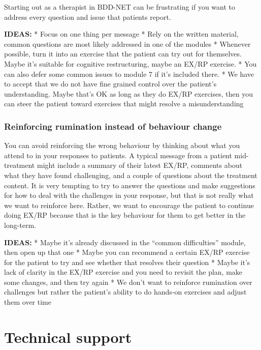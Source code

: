\documentclass[]{book}
\theoremstyle{definition}
\theoremstyle{definition}
\theoremstyle{definition}
\theoremstyle{remark}
\begin{document}
Starting out as a therapist in BDD-NET can be frustrating if you want to
address every question and issue that patients report.

\textbf{IDEAS:} * Focus on one thing per message * Rely on the written
material, common questions are most likely addressed in one of the
modules * Whenever possible, turn it into an exercise that the patient
can try out for themselves. Maybe it's suitable for cognitive
restructuring, maybe an EX/RP exercise. * You can also defer some common
issues to module 7 if it's included there. * We have to accept that we
do not have fine grained control over the patient's understanding. Maybe
that's OK as long as they do EX/RP exercises, then you can steer the
patient toward exercises that might resolve a misunderstanding

\hypertarget{reinforcing-rumination-instead-of-behaviour-change}{%
\subsection{Reinforcing rumination instead of behaviour
change}\label{reinforcing-rumination-instead-of-behaviour-change}}

You can avoid reinforcing the wrong behaviour by thinking about what you
attend to in your responses to patients. A typical message from a
patient mid-treatment might include a summary of their latest EX/RP,
comments about what they have found challenging, and a couple of
questions about the treatment content. It is very tempting to try to
answer the questions and make suggestions for how to deal with the
challenges in your response, but that is not really what we want to
reinforce here. Rather, we want to encourage the patient to continue
doing EX/RP because that is the key behaviour for them to get better in
the long-term.

\textbf{IDEAS:} * Maybe it's already discussed in the ``common
difficulties'' module, then open up that one * Maybe you can recommend a
certain EX/RP exercise for the patient to try and see whether that
resolves their question * Maybe it's lack of clarity in the EX/RP
exercise and you need to revisit the plan, make some changes, and then
try again * We don't want to reinforce rumination over challenges but
rather the patient's ability to do hands-on exercises and adjust them
over time

\hypertarget{technical-support}{%
\chapter{Technical support}\label{technical-support}}
\end{document}
